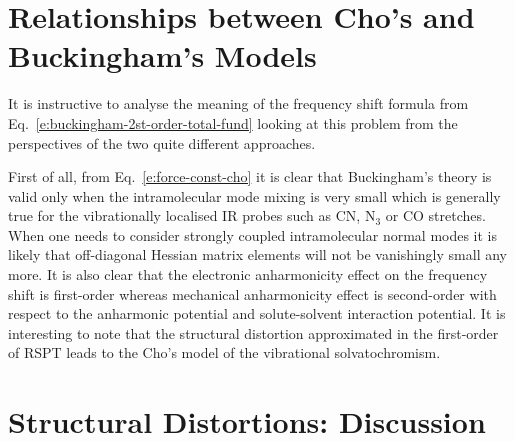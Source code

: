 \documentclass[a4paper,titlepage,twoside,fleqn,12pt]{book}
\begin{document}
\begin{refsection}
\section{Relationships between Cho's and Buckingham's Models}

It is instructive to analyse the meaning of the frequency shift
formula from Eq.~\eqref{e:buckingham-2st-order-total-fund}
looking at this problem from the perspectives of the two quite different approaches.

First of all, from Eq.~\eqref{e:force-const-cho} it is clear 
that Buckingham's theory is valid only
when the intramolecular mode mixing is very small which
is generally true for the vibrationally localised IR probes
such as CN, N$_3$ or CO stretches. When one needs to consider
strongly coupled intramolecular normal modes it is likely
that off\hyp{}diagonal Hessian matrix elements will not be vanishingly
small any more. It is also
clear that the electronic anharmonicity effect on the frequency 
shift is first\hyp{}order
whereas mechanical anharmonicity effect is second\hyp{}order 
with respect to the anharmonic potential and solute\hyp{}solvent
interaction potential. It is interesting to note 
that the structural distortion approximated
in the first\hyp{}order of RSPT leads to the Cho's model of the vibrational
solvatochromism. 

\section{Structural Distortions: Discussion \label{s:str-dist-general-discussion}}


\end{refsection}
\end{document}
